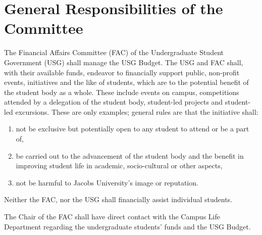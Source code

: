 \documentclass[12pt]{LaTeX_Misc/constitution}
\begin{document}



\label{FinByLawsdef}
\section{General Responsibilities of the Committee}
The Financial Affairs Committee (FAC) of the Undergraduate Student Government (USG) shall manage the USG Budget. The USG and FAC shall, with their available funds, endeavor to financially support public, non-profit events, initiatives and the like of students, which are to the potential benefit of the student body as a whole. These include events on campus, competitions attended by a delegation of the student body, student-led projects and student-led excursions. These are only examples; general rules are that the initiative shall:
\begin{enumerate}
\item	not be exclusive but potentially open to any student to attend or be a part of, 
\item	be carried out to the advancement of the student body and the benefit in improving student life in academic, socio-cultural or other aspects,
\item	not be harmful to Jacobs University's image or reputation.
\end{enumerate}

Neither the FAC, nor the USG shall financially assist individual students. 

 The Chair of the FAC shall have direct contact with the Campus Life Department regarding the undergraduate students' funds and the USG Budget. %
\end{document}
